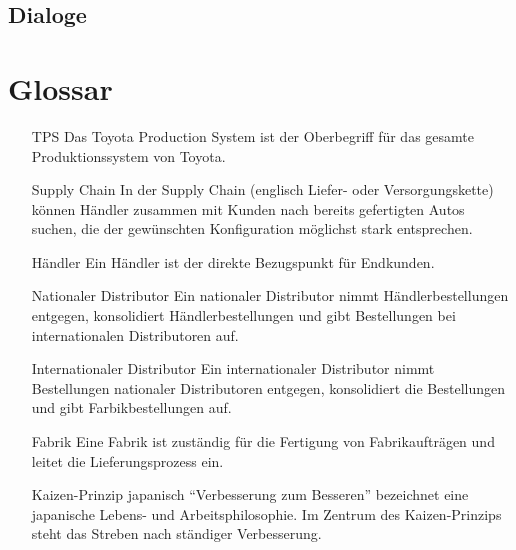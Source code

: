 \documentclass[a4paper,10pt,left=1.5cm,right=1.5cm,top=1.5cm,bottom=1.5cm]{article}
\begin{document}
\subsection{Dialoge}

\section{Glossar}

\begin{itemize}
  \item[TPS] Das Toyota Production System ist der Oberbegriff für das gesamte Produktionssystem von Toyota.
  \item[Supply Chain] In der Supply Chain (englisch Liefer- oder Versorgungskette) können Händler zusammen mit Kunden nach bereits gefertigten Autos suchen, die der gewünschten Konfiguration möglichst stark entsprechen.
  \item[Händler] Ein Händler ist der direkte Bezugspunkt für Endkunden.
  \item[Nationaler Distributor] Ein nationaler Distributor nimmt Händlerbestellungen entgegen, konsolidiert Händlerbestellungen und gibt Bestellungen bei internationalen Distributoren auf.
  \item[Internationaler Distributor] Ein internationaler Distributor nimmt Bestellungen nationaler Distributoren entgegen, konsolidiert die Bestellungen und gibt Farbikbestellungen auf.
  \item[Fabrik] Eine Fabrik ist zuständig für die Fertigung von Fabrikaufträgen und leitet die Lieferungsprozess ein.
  \item[Kaizen-Prinzip] japanisch "`Verbesserung zum Besseren"' bezeichnet eine japanische Lebens- und Arbeitsphilosophie. Im Zentrum des Kaizen-Prinzips steht das Streben nach ständiger Verbesserung.
\end{itemize}
\end{document}
